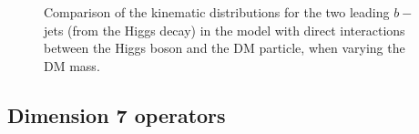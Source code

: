 \begin{figure}[hbpt!]
 	\hfill
 	\hfill
 	\caption{Comparison of the kinematic distributions for the two leading $b-$ jets (from the Higgs decay) in the model with direct interactions
 		between the Higgs boson and the DM particle, when varying the DM mass. 
 		\label{fig:Hbb_Dim5}}
 \end{figure}
 

\subsection{Dimension 7 operators}
\label{sub:EW_EFT_Dim7}


